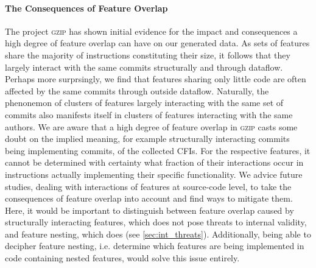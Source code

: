 \paragraph{The Consequences of Feature Overlap}
The project \textsc{gzip} has shown initial evidence for the impact and consequences a high degree of feature overlap can have on our generated data.
As sets of features share the majority of instructions constituting their size, it follows that they largely interact with the same commits structurally and through dataflow.
Perhaps more surprsingly, we find that features sharing only little code are often affected by the same commits through outside dataflow. 
Naturally, the phenonemon of clusters of features largely interacting with the same set of commits also manifests itself in clusters of features interacting with the same authors.
We are aware that a high degree of feature overlap in \textsc{gzip} casts some doubt on the implied meaning, for example structurally interacting commits being implementing commits, of the collected CFIs.
For the respective features, it cannot be determined with certainty what fraction of their interactions occur in instructions actually implementing their specific functionality.
We advice future studies, dealing with interactions of features at source-code level, to take the consequences of feature overlap into account and find ways to mitigate them.
Here, it would be important to distinguish between feature overlap caused by structurally interacting features, which does not pose threats to internal validity, and feature nesting, which does (see \autoref{sec:int_threats}). 
Additionally, being able to decipher feature nesting, i.e. determine which features are being implemented in code containing nested features, would solve this issue entirely.

